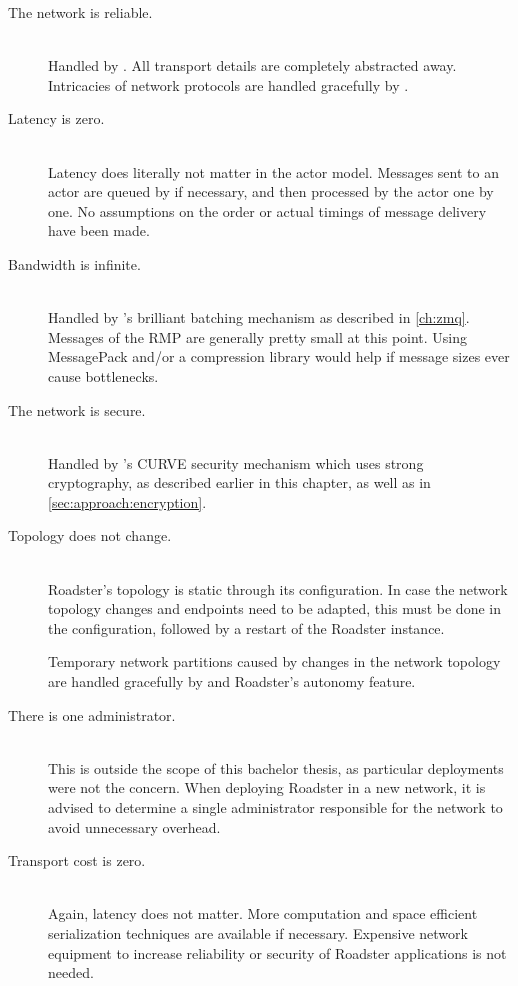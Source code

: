 \begin{description}
	\item [The network is reliable.] \hfill\\
		Handled by \zmq. All transport details are completely
		abstracted away. Intricacies of network protocols are handled
		gracefully by \zmq.

	\item [Latency is zero.] \hfill\\
		Latency does literally not matter in the actor model. Messages
		sent to an actor are queued by \zmq if necessary, and
		then processed by the actor one by one. No assumptions on the
		order or actual timings of message delivery have been made.

	\item [Bandwidth is infinite.] \hfill\\
		Handled by \zmq's brilliant batching mechanism as described in \autoref{ch:zmq}.
		Messages of the \gls{RMP} are generally pretty small at this
		point. Using MessagePack and/or a compression library would
		help if message sizes ever cause bottlenecks.

	\item [The network is secure.] \hfill\\
		Handled by \zmq's CURVE security mechanism which uses strong
		cryptography, as described earlier in this chapter, as well as
		in \autoref{sec:approach:encryption}.

	\item [Topology does not change.] \hfill\\
		Roadster's topology is static through its configuration. In
		case the network topology changes and endpoints need to be
		adapted, this must be done in the configuration, followed by a
		restart of the Roadster instance.

		Temporary network partitions caused by changes in the network
		topology are handled gracefully by \zmq and Roadster's autonomy
		feature.

	\item [There is one administrator.] \hfill\\
		This is outside the scope of this bachelor thesis, as
		particular deployments were not the concern. When deploying
		Roadster in a new network, it is advised to determine a single
		administrator responsible for the network to avoid unnecessary
		overhead.

	\item [Transport cost is zero.] \hfill\\
		Again, latency does not matter. More computation and space
		efficient serialization techniques are available if necessary.
		Expensive network equipment to increase reliability or security
		of Roadster applications is not needed.


\end{description}
